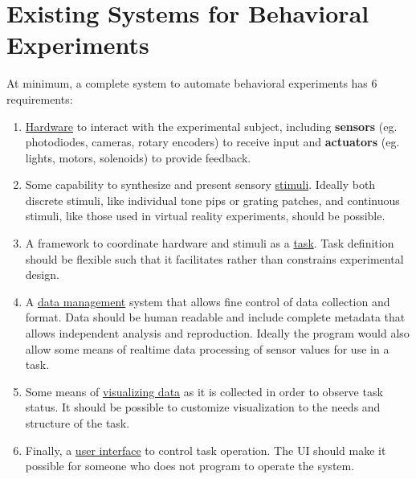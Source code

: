\section{Existing Systems for Behavioral Experiments}
\label{sec:existing}

At minimum, a complete system to automate behavioral experiments has 6 requirements:

\begin{enumerate}

\item \hyperref[sec:hardware]{Hardware} to interact with the experimental subject, including \textbf{sensors} (eg. photodiodes, cameras, rotary encoders) to receive input and \textbf{actuators} (eg. lights, motors, solenoids) to provide feedback.
\item Some capability to synthesize and present sensory \hyperref[sec:stim]{stimuli}. Ideally both discrete stimuli, like individual tone pips or grating patches, and continuous stimuli, like those used in virtual reality experiments, should be possible.
\item A  framework to coordinate hardware and stimuli as a \hyperref[sec:tasks]{task}. Task definition should be flexible such that it facilitates rather than constrains experimental design.
\item A \hyperref[sec:data]{data management} system that allows fine control of data collection and format. Data should be human readable and include complete metadata that allows independent analysis and reproduction. Ideally the program would also allow some means of realtime data processing of sensor values for use in a task.
\item Some means of \hyperref[sec:plotting]{visualizing data} as it is collected in order to  observe task status. It should be possible to customize visualization to the needs and structure of the task.
\item Finally, a \hyperref[sec:ui]{user interface} to control task operation. The UI should make it possible for someone who does not program to operate the system.
\end{enumerate}

